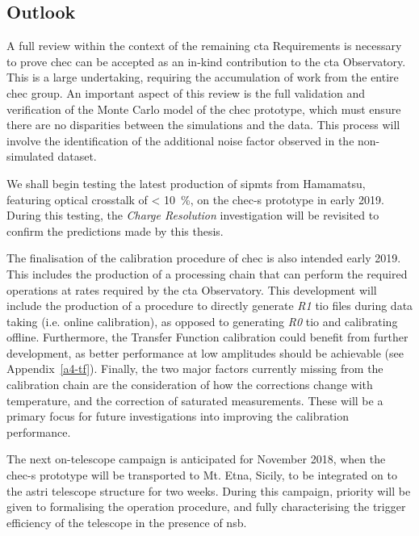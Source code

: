 \subsection{Outlook}
 
A full review within the context of the remaining \gls{cta} Requirements is necessary to prove \gls{chec} can be accepted as an in-kind contribution to the \gls{cta} Observatory. This is a large undertaking, requiring the accumulation of work from the entire \gls{chec} group. An important aspect of this review is the full validation and verification of the Monte Carlo model of the \gls{chec} prototype, which must ensure there are no disparities between the simulations and the data. This process will involve the identification of the additional noise factor observed in the non-simulated dataset.

We shall begin testing the latest production of \glspl{sipmt} from Hamamatsu, featuring optical crosstalk of \SI{< 10}{\percent}, on the \gls{chec-s} prototype in early 2019. During this testing, the \textit{Charge Resolution} investigation will be revisited to confirm the predictions made by this thesis.

The finalisation of the calibration procedure of \gls{chec} is also intended early 2019. This includes the production of a processing chain that can perform the required operations at rates required by the \gls{cta} Observatory. This development will include the production of a procedure to directly generate \textit{R1} \gls{tio} files during data taking (i.e. online calibration), as opposed to generating \textit{R0} \gls{tio} and calibrating offline. Furthermore, the Transfer Function calibration could benefit from further development, as better performance at low amplitudes should be achievable (see Appendix~\ref{a4-tf}). Finally, the two major factors currently missing from the calibration chain are the consideration of how the corrections change with temperature, and the correction of saturated measurements. These will be a primary focus for future investigations into improving the calibration performance.

The next on-telescope campaign is anticipated for November 2018, when the \gls{chec-s} prototype will be transported to Mt. Etna, Sicily, to be integrated on to the \gls{astri} telescope structure for two weeks. During this campaign, priority will be given to formalising the operation procedure, and fully characterising the trigger efficiency of the telescope in the presence of \gls{nsb}.